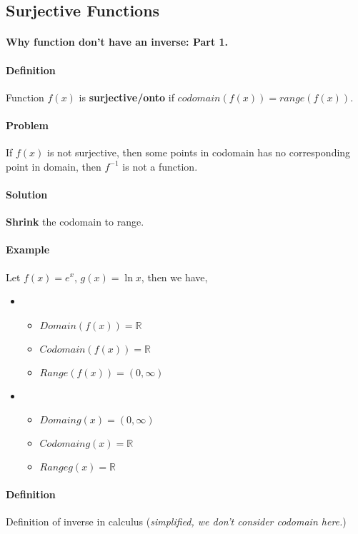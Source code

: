 \documentclass{article}
\begin{document}
	\subsection{Surjective Functions}
	\paragraph{Why function don't have an inverse: Part 1.}
	\paragraph{Definition} Function $f(x)$ is \textbf{surjective/onto} if $codomain(f(x))=range(f(x))$.
	\paragraph{Problem} If $f(x)$ is not surjective, then some points in codomain has no corresponding point in domain, then $f^{-1}$ is not a function.
	\paragraph{Solution} \textbf{Shrink} the codomain to range.
	\paragraph{Example} Let $f(x) = e^x$, $g(x) = \ln{x}$, then we have,
	\begin{itemize}
		\item 
			\begin{itemize}
				\item $Domain(f(x)) = \mathbb{R}$
				\item $Codomain(f(x)) = \mathbb{R}$
				\item $Range(f(x)) = (0, \infty)$
			\end{itemize}
		\item
			\begin{itemize}
				\item $Domain g(x) = (0, \infty)$
				\item $Codomain g(x) = \mathbb{R}$
				\item $Range g(x) = \mathbb{R}$
			\end{itemize}
	\end{itemize}
	\paragraph{Definition} Definition of inverse in calculus (\emph{simplified, we don't consider codomain here.})
\end{document}
